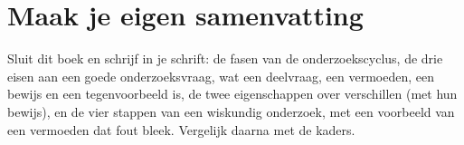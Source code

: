 

\begin{oefeningen}

\end{oefeningen}


\begin{oefeningen}




\end{oefeningen}


\ifzelfstudie
\section*{Maak je eigen samenvatting}
Sluit dit boek en schrijf in je schrift: de fasen van de onderzoekscyclus, de drie eisen aan een goede onderzoeksvraag, wat een deelvraag, een vermoeden, een bewijs en een tegenvoorbeeld is, de twee eigenschappen over verschillen (met hun bewijs), en de vier stappen van een wiskundig onderzoek, met een voorbeeld van een vermoeden dat fout bleek. Vergelijk daarna met de kaders.
\fi
